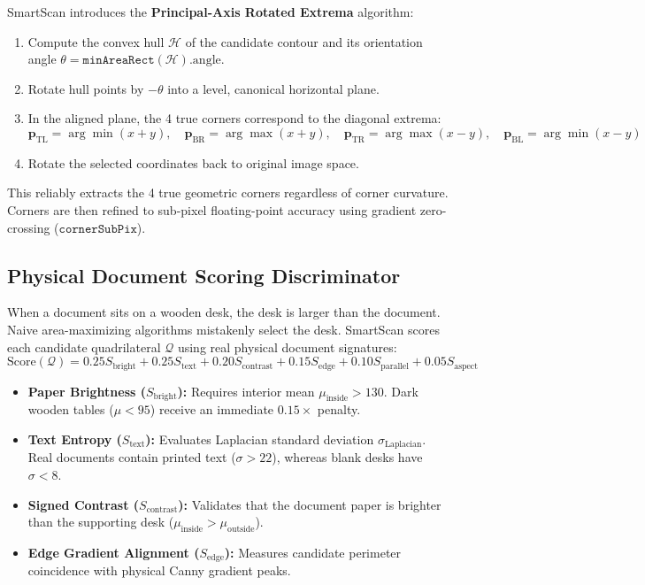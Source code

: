 \documentclass[11pt,a4paper]{article}
\begin{document}
SmartScan introduces the \textbf{Principal-Axis Rotated Extrema} algorithm:
\begin{enumerate}[leftmargin=1.5em,itemsep=0.15em]
    \item Compute the convex hull $\mathcal{H}$ of the candidate contour and its orientation angle $\theta = \mathtt{minAreaRect}(\mathcal{H}).\text{angle}$.
    \item Rotate hull points by $-\theta$ into a level, canonical horizontal plane.
    \item In the aligned plane, the 4 true corners correspond to the diagonal extrema:
    \begin{equation}
        \mathbf{p}_{\text{TL}} = \arg\min(x + y), \quad \mathbf{p}_{\text{BR}} = \arg\max(x + y), \quad \mathbf{p}_{\text{TR}} = \arg\max(x - y), \quad \mathbf{p}_{\text{BL}} = \arg\min(x - y)
    \end{equation}
    \item Rotate the selected coordinates back to original image space.
\end{enumerate}
This reliably extracts the 4 true geometric corners regardless of corner curvature. Corners are then refined to sub-pixel floating-point accuracy using gradient zero-crossing ($\mathtt{cornerSubPix}$).

\subsection{Physical Document Scoring Discriminator}
When a document sits on a wooden desk, the desk is larger than the document. Naive area-maximizing algorithms mistakenly select the desk. SmartScan scores each candidate quadrilateral $\mathcal{Q}$ using real physical document signatures:
\begin{equation}
    \text{Score}(\mathcal{Q}) = 0.25 S_{\text{bright}} + 0.25 S_{\text{text}} + 0.20 S_{\text{contrast}} + 0.15 S_{\text{edge}} + 0.10 S_{\text{parallel}} + 0.05 S_{\text{aspect}}
\end{equation}
\begin{itemize}[leftmargin=1.5em,itemsep=0.15em]
    \item \textbf{Paper Brightness ($S_{\text{bright}}$):} Requires interior mean $\mu_{\text{inside}} > 130$. Dark wooden tables ($\mu < 95$) receive an immediate $0.15\times$ penalty.
    \item \textbf{Text Entropy ($S_{\text{text}}$):} Evaluates Laplacian standard deviation $\sigma_{\text{Laplacian}}$. Real documents contain printed text ($\sigma > 22$), whereas blank desks have $\sigma < 8$.
    \item \textbf{Signed Contrast ($S_{\text{contrast}}$):} Validates that the document paper is brighter than the supporting desk ($\mu_{\text{inside}} > \mu_{\text{outside}}$).
    \item \textbf{Edge Gradient Alignment ($S_{\text{edge}}$):} Measures candidate perimeter coincidence with physical Canny gradient peaks.
\end{itemize}
\end{document}
